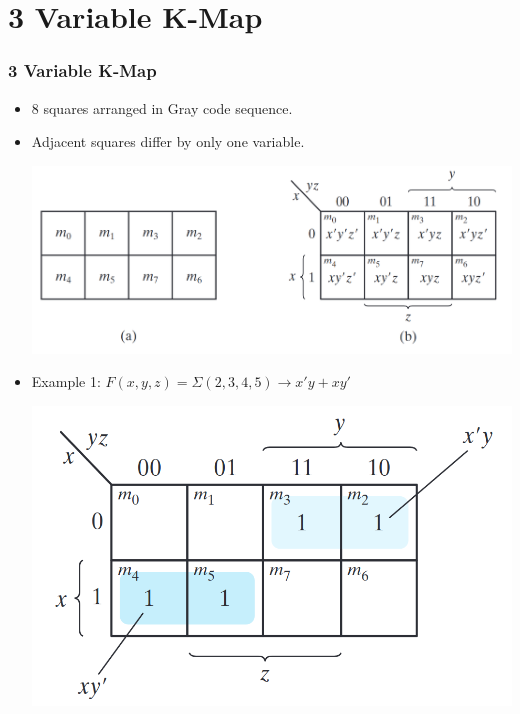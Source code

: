 \documentclass[Serif, 10pt, brown]{beamer}
\theoremstyle{example}
\theoremstyle{plain}
\begin{document}
\section[3 Variable K-Map]{3 Variable K-Map }
\begin{frame}
	\frametitle{3 Variable K-Map }
	\transfly
	 \begin{itemize}
        \item 8 squares arranged in Gray code sequence.
        \item Adjacent squares differ by only one variable.
        
    
    \begin{center}
        \includegraphics[width=0.6\linewidth]{figs/3var.png}
    \end{center}
    \item Example 1: \( F(x,y,z) = \Sigma(2,3,4,5) \rightarrow x' y + xy' \)
    \begin{center}
        \includegraphics[width=0.5\linewidth]{figs/3ex1.png}
    \end{center}
    \end{itemize}
	

\end{frame}
\end{document}
